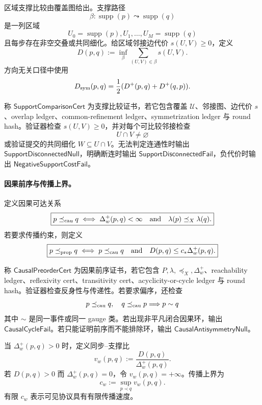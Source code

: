 区域支撑比较由覆盖图给出。支撑路径
\[
\beta:\operatorname{supp}(p)\leadsto\operatorname{supp}(q)
\]
是一列区域
\[
U_0=\operatorname{supp}(p),U_1,\ldots,U_M=\operatorname{supp}(q)
\]
且每步存在非空交叠或共同细化。给区域邻接边代价 \(s(U,V)\ge0\)，定义
\[
\boxed{
D(p,q):=
\inf_{\beta}
\sum_{(U,V)\in\beta}s(U,V).
}
\]
方向无关口径中使用
\[
D_{\rm sym}(p,q)=\frac12(D^+(p,q)+D^+(q,p)).
\]

\begin{definition}[支撑比较证书]\label{def:typed-address-biaxial-completion-support-comparison-cert}
称 \(\mathsf{SupportComparisonCert}\) 为支撑比较证书，若它包含覆盖 \(\mathcal U\)、邻接图、边代价 \(s\)、overlap ledger、common-refinement ledger、symmetrization ledger 与 round hash。验证器检查 \(s(U,V)\ge0\)，并对每个可比较邻接检查
\[
U\cap V\neq\varnothing
\]
或验证提交的共同细化 \(W\subseteq U\cap V\)。无法判定连通性时输出 \(\mathsf{SupportDisconnectedNull}\)，明确断连时输出 \(\mathsf{SupportDisconnectedFail}\)，负代价时输出 \(\mathsf{NegativeSupportCostFail}\)。
\end{definition}

\paragraph{因果前序与传播上界。}
定义因果可达关系
\[
\boxed{
p\preceq_{\rm cau}q
\iff
\Delta_w^+(p,q)<\infty
\quad\text{and}\quad
\lambda(p)\preceq_X\lambda(q).
}
\]
若要求传播约束，则定义
\[
\boxed{
p\preceq_{\rm prop}q
\iff
p\preceq_{\rm cau}q
\quad\text{and}\quad
D(p,q)\le c_\ast\Delta_w^+(p,q).
}
\]

\begin{definition}[因果前序证书]\label{def:typed-address-biaxial-completion-causal-preorder-cert}
称 \(\mathsf{CausalPreorderCert}\) 为因果前序证书，若它包含 \(P,\lambda,\preceq_X,\Delta_w^+\)、reachability ledger、reflexivity cert、transitivity cert、acyclicity-or-cycle ledger 与 round hash。验证器检查反身性与传递性。若要求偏序，还检查
\[
p\preceq_{\rm cau}q,\quad q\preceq_{\rm cau}p
\Longrightarrow
p\sim q
\]
其中 \(\sim\) 是同一事件或同一 gauge 类。若出现非平凡闭合因果环，输出 \(\mathsf{CausalCycleFail}\)。若只能证明前序而不能排除环，输出 \(\mathsf{CausalAntisymmetryNull}\)。
\end{definition}

当 \(\Delta_w^+(p,q)>0\) 时，定义同步--支撑比
\[
\boxed{
v_w(p,q):=\frac{D(p,q)}{\Delta_w^+(p,q)}.
}
\]
若 \(D(p,q)>0\) 而 \(\Delta_w^+(p,q)=0\)，令 \(v_w(p,q)=+\infty\)。传播上界为
\[
\boxed{
c_w:=\sup_{p\prec q}v_w(p,q).
}
\]
有限 \(c_w\) 表示可见协议具有有限传播速度。

